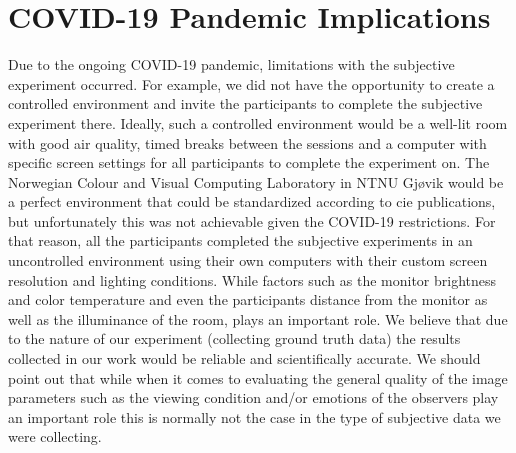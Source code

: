 \section{COVID-19 Pandemic Implications}
Due to the ongoing COVID-19 pandemic, limitations with the subjective experiment occurred. For example, we did not have the opportunity to create a controlled environment and invite the participants to complete the subjective experiment there. Ideally, such a controlled environment would be a well-lit room with good air quality, timed breaks between the sessions and a computer with specific screen settings for all participants to complete the experiment on. The Norwegian Colour and Visual Computing Laboratory in NTNU Gjøvik would be a perfect environment that could be standardized according to \acrfull{cie} publications, but unfortunately this was not achievable given the COVID-19 restrictions. For that reason, all the participants completed the subjective experiments in an uncontrolled environment using their own computers with their custom screen resolution and lighting conditions. While factors such as the monitor brightness and color temperature and even the participants distance from the monitor as well as the illuminance of the room, plays an important role. We believe that due to the nature of our experiment (collecting ground truth data) the results collected in our work would be reliable and scientifically accurate. We should point out that while when it comes to evaluating the general quality of the image parameters such as the viewing condition and/or emotions of the observers play an important role this is normally not the case in the type of subjective data we were collecting. 

\raggedbottom %

